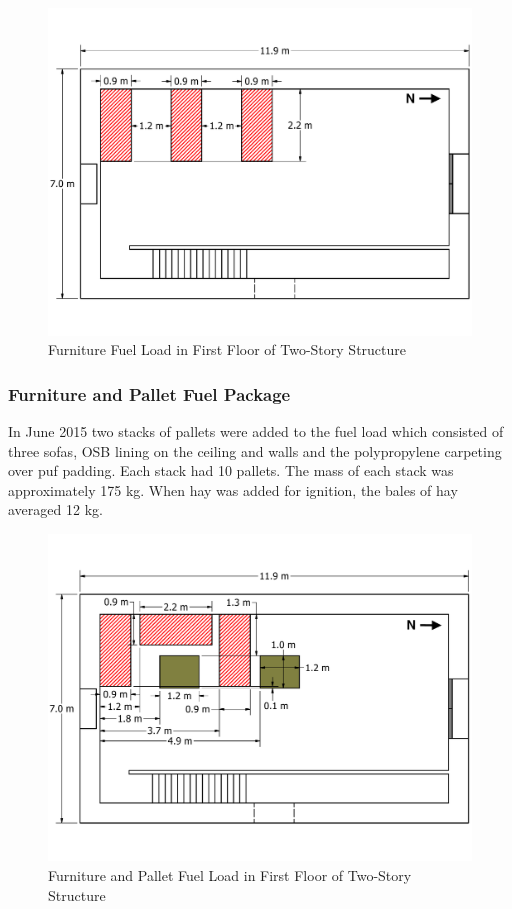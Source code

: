 \documentclass[12pt,oneside]{book}
\begin{document}
\begin{figure}[!ht]
	\includegraphics[width=\columnwidth]{../../DelCo_2014_2015/Drawings/PDFs/CAFS/West_Structure_1st_Floor_Furniture_Only}
	\caption{Furniture Fuel Load in First Floor of Two-Story Structure}
	\label{fig:furniture_2story}
\end{figure}

\subsubsection{Furniture and Pallet Fuel Package}
\label{sec:fire_suppression_combo_fuel_2}

In June 2015 two stacks of pallets were added to the fuel load which consisted of three sofas, OSB lining on the ceiling and walls and the polypropylene carpeting over puf padding.  Each stack had 10 pallets.  The mass of each stack was approximately 175 kg.  When hay was added for ignition, the bales of hay averaged 12 kg.

\begin{figure}[!ht]
	\includegraphics[width=\columnwidth]{../../DelCo_2014_2015/Drawings/PDFs/CAFS/West_Structure_1st_Floor_Furniture_Pallets}
	\caption{Furniture and Pallet Fuel Load in First Floor of Two-Story Structure}
	\label{fig:pallet_furniture_2story}
\end{figure}
\end{document}
